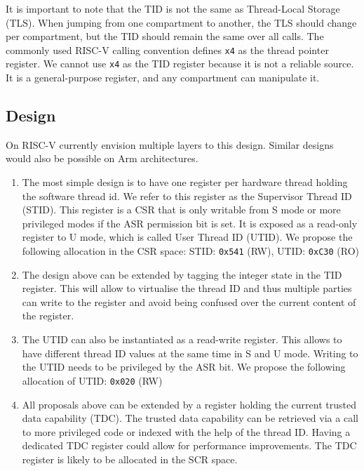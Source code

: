 It is important to note that the TID is not the same as Thread-Local Storage (TLS).
When jumping from one compartment to another, the TLS should change per compartment, but the TID should remain the same over all calls.
The commonly used RISC-V calling convention defines \texttt{x4} as the thread pointer register.
We cannot use \texttt{x4} as the TID register because it is not a reliable source.
It is a general-purpose register, and any compartment can manipulate it.

\subsection{Design}

On RISC-V currently envision multiple layers to this design.
Similar designs would also be possible on Arm architectures.

\begin{enumerate}
\item The most simple design is to have one register per hardware thread holding the software thread id.
      We refer to this register as the Supervisor Thread ID (STID).
      This register is a CSR that is only writable from S mode or more privileged modes if the ASR permission bit is set.
      It is exposed as a read-only register to U mode, which is called User Thread ID (UTID).
      We propose the following allocation in the CSR space: STID: \texttt{0x541} (RW), UTID: \texttt{0xC30} (RO)
\item The design above can be extended by tagging the integer state in the TID register.
      This will allow to virtualise the thread ID and thus multiple parties can write to the register and avoid being confused over the current content of the register.
\item The UTID can also be instantiated as a read-write register.
      This allows to have different thread ID values at the same time in S and U mode.
      Writing to the UTID needs to be privileged by the ASR bit.
      We propose the following allocation of UTID: \texttt{0x020} (RW)
\item All proposals above can be extended by a register holding the current trusted data capability (TDC).
      The trusted data capability can be retrieved via a call to more privileged code or indexed with the help of the thread ID.
      Having a dedicated TDC register could allow for performance improvements.
      The TDC register is likely to be allocated in the SCR space.
\end{enumerate}

